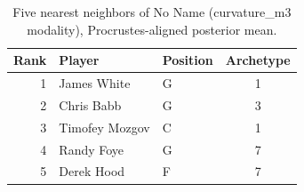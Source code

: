 \begin{table}[htbp]
  \centering\small
  \begin{tabular}{rllc}
    \toprule
    Rank & Player & Position & Archetype \\
    \midrule
    1 & James White & G & 1 \\
    2 & Chris Babb & G & 3 \\
    3 & Timofey Mozgov & C & 1 \\
    4 & Randy Foye & G & 7 \\
    5 & Derek Hood & F & 7 \\
    \bottomrule
  \end{tabular}
  \caption{Five nearest neighbors of No Name (curvature_m3 modality), Procrustes-aligned posterior mean.}
  \label{tab:No_Name_neighbors_curvature_m3}
\end{table}

